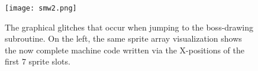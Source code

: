 \begin{figure}
\texttt{[image: smw2.png]}
\caption{The graphical glitches that occur when jumping to the boss-drawing subroutine. On the left, the same sprite array visualization shows the now complete machine code written via the X-positions of the first 7 sprite slots.}
\end{figure}
